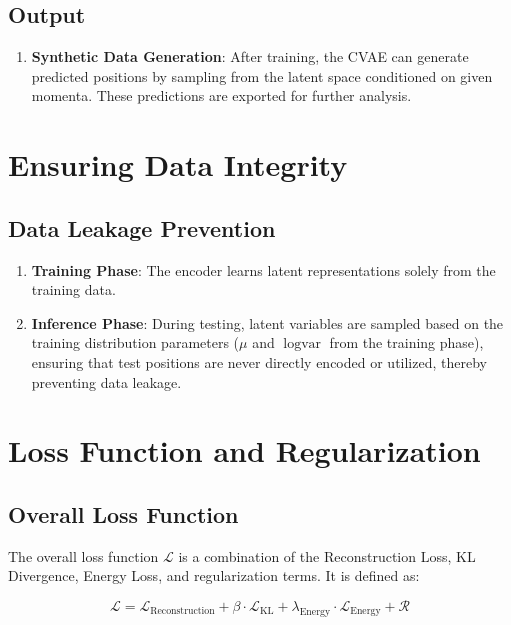 \documentclass[12pt]{article}
\begin{document}
\subsection{Output}

\begin{enumerate}[label=\alph*.]
    \item \textbf{Synthetic Data Generation}: After training, the CVAE can generate predicted positions by sampling from the latent space conditioned on given momenta. These predictions are exported for further analysis.
\end{enumerate}

\section{Ensuring Data Integrity}

\subsection{Data Leakage Prevention}

\begin{enumerate}[label=\alph*.]
    \item \textbf{Training Phase}: The encoder learns latent representations solely from the training data.
    \item \textbf{Inference Phase}: During testing, latent variables are sampled based on the training distribution parameters (\(\mu\) and \(\log \text{var}\) from the training phase), ensuring that test positions are never directly encoded or utilized, thereby preventing data leakage.
\end{enumerate}

\section{Loss Function and Regularization}

\subsection{Overall Loss Function}

The overall loss function \( \mathcal{L} \) is a combination of the Reconstruction Loss, KL Divergence, Energy Loss, and regularization terms. It is defined as:

\[
\mathcal{L} = \mathcal{L}_{\text{Reconstruction}} + \beta \cdot \mathcal{L}_{\text{KL}} + \lambda_{\text{Energy}} \cdot \mathcal{L}_{\text{Energy}} + \mathcal{R}
\]
\end{document}
